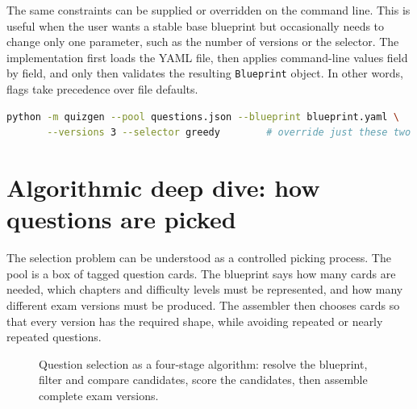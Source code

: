 \documentclass[11pt,a4paper]{article}
\newcommand{\code}[1]{\texttt{\small #1}}
\begin{document}
The same constraints can be supplied or overridden on the command line. This is
useful when the user wants a stable base blueprint but occasionally needs to
change only one parameter, such as the number of versions or the selector. The
implementation first loads the YAML file, then applies command-line values
field by field, and only then validates the resulting \code{Blueprint} object.
In other words, flags take precedence over file defaults.

\begin{lstlisting}[language=bash]
python -m quizgen --pool questions.json --blueprint blueprint.yaml \
       --versions 3 --selector greedy        # override just these two
\end{lstlisting}

\section{Algorithmic deep dive: how questions are picked}
\label{sec:algorithm-deep-dive}

The selection problem can be understood as a controlled picking process. The
pool is a box of tagged question cards. The blueprint says how many cards are
needed, which chapters and difficulty levels must be represented, and how many
different exam versions must be produced. The assembler then chooses cards so
that every version has the required shape, while avoiding repeated or nearly
repeated questions.

\begin{figure}[h]
\centering
{}
\caption{Question selection as a four-stage algorithm: resolve the blueprint,
filter and compare candidates, score the candidates, then assemble complete
exam versions.}
\label{fig:deep-pipeline}
\end{figure}
\end{document}
